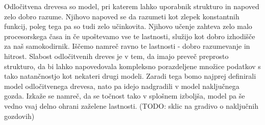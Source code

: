 \documentclass[12pt,a4paper]{article}
\begin{document}
Odločitvena drevesa so model, pri katerem lahko uporabnik strukturo in napoved zelo dobro razume. 
Njihovo napoved se da razumeti kot zlepek konstantnih funkcij, poleg tega pa so tudi zelo učinkovita. 
Njihovo učenje zahteva zelo malo procesorskega časa in če upoštevamo vse te lastnosti, služijo kot dobro izhodišče za naš samokodirnik. 
Iščemo namreč ravno te lastnosti - dobro razumevanje in hitrost. Slabost odločitvenih dreves je v tem, da imajo preveč preprosto strukturo, 
da bi lahko napovedovala kompleksno porazdeljene množice podatkov s tako natančnostjo kot nekateri drugi modeli. 
Zaradi tega bomo najprej definirali model odločitvenega drevesa, nato pa idejo nadgradili v model naključnega gozda. 
Izkaže se namreč, da se točnost tako v splošnem izboljša, model pa še vedno vsaj delno ohrani zaželene lastnosti. (TODO: sklic na gradivo o naključnih gozdovih)
\end{document}
